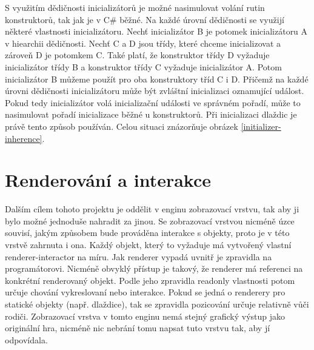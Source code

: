 S využitím dědičnosti inicializátorů je možné nasimulovat volání rutin konstruktorů, tak jak je v C\#  běžné. Na každé úrovní dědičnosti
se využijí některé vlastnosti inicializátoru. Nechť inicializátor B
je potomek inicializátoru A v hiearchii dědičnosti. Nechť C a D jsou třídy, které chceme inicializovat a zároveň D je potomkem C.
Také platí, že konstruktor třídy D vyžaduje inicializátor třídy B a konstruktor třídy C vyžaduje inicializátor A. Potom inicializátor B můžeme
použít pro oba konstruktory tříd C i D. Přičemž na každé úrovni dědičnosti inicializátoru může být zvláštní inicializaci oznamující událost.
Pokud tedy inicializátor volá inicializační události ve správném pořadí, může to nasimulovat pořadí inicializace běžné u konstruktorů.
Při inicializaci dlaždic je právě tento způsob používán. Celou situaci znázorňuje obrázek \ref{initializer-inherence}.


\section{Renderování a interakce}\label{renderer-interactor}
Dalším cílem tohoto projektu je oddělit v enginu zobrazovací vrstvu, tak aby ji bylo možné jednoduše nahradit za jinou.
Se zobrazovací vrstvou nicméně úzce souvisí, jakým způsobem bude prováděna interakce s objekty, proto je v této vrstvě zahrnuta i ona. 
Každý objekt, který to vyžaduje má vytvořený vlastní renderer-interactor na míru. Jak renderer vypadá uvnitř je zpravidla na programátorovi. 
Nicméně obvyklý přístup je takový, že renderer má referenci na konkrétní renderovaný objekt. Podle jeho zpravidla readonly vlastnosti potom určuje
chování vykreslovaní nebo interakce. Pokud se jedná o renderery pro statické objekty (např. dlaždice), tak se zpravidla pozicování určuje relativně
vůči rodiči. Zobrazovací vrstva v tomto enginu nemá stejný grafický výstup jako originální hra, nicméně nic nebrání tomu napsat 
 tuto vrstvu tak, aby jí odpovídala.
